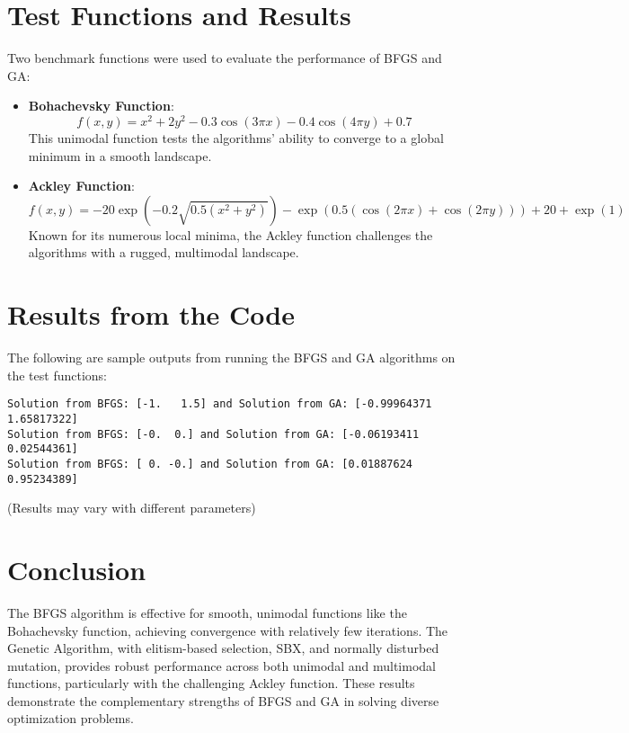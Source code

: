 \documentclass[12pt,a4paper,oneside]{paper} %
\begin{document}
\section{Test Functions and Results}

Two benchmark functions were used to evaluate the performance of BFGS and GA:

\begin{itemize}
    \item \textbf{Bohachevsky Function}: 
    \[
    f(x, y) = x^2 + 2y^2 - 0.3\cos(3\pi x) - 0.4\cos(4\pi y) + 0.7
    \]
    This unimodal function tests the algorithms' ability to converge to a global minimum in a smooth landscape.

    \item \textbf{Ackley Function}:
    \[
    f(x, y) = -20 \exp\left(-0.2 \sqrt{0.5(x^2 + y^2)}\right) - \exp\left(0.5(\cos(2\pi x) + \cos(2\pi y))\right) + 20 + \exp(1)
    \]
    Known for its numerous local minima, the Ackley function challenges the algorithms with a rugged, multimodal landscape.
\end{itemize}

\section{Results from the Code}

The following are sample outputs from running the BFGS and GA algorithms on the test functions:

\begin{verbatim}
Solution from BFGS: [-1.   1.5] and Solution from GA: [-0.99964371  1.65817322]
Solution from BFGS: [-0.  0.] and Solution from GA: [-0.06193411  0.02544361]
Solution from BFGS: [ 0. -0.] and Solution from GA: [0.01887624 0.95234389]
\end{verbatim}
(Results may vary with different parameters)

\section{Conclusion}

The BFGS algorithm is effective for smooth, unimodal functions like the Bohachevsky function, achieving convergence with relatively few iterations. The Genetic Algorithm, with elitism-based selection, SBX, and normally disturbed mutation, provides robust performance across both unimodal and multimodal functions, particularly with the challenging Ackley function. These results demonstrate the complementary strengths of BFGS and GA in solving diverse optimization problems.

\end{document}
